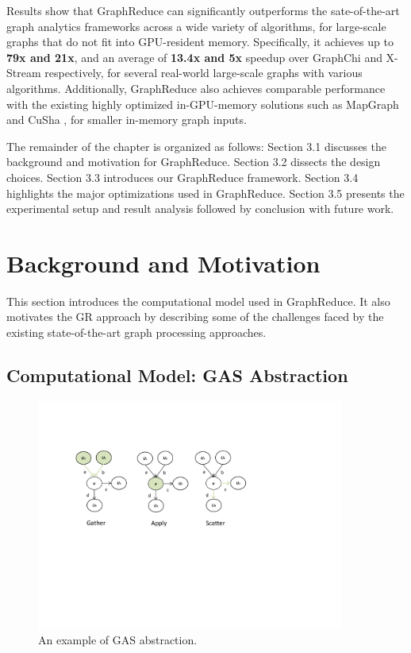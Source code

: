 Results show that GraphReduce can significantly outperforms the sate-of-the-art graph analytics frameworks across a wide variety of algorithms, for large-scale graphs that do not fit into GPU-resident memory. Specifically, it achieves up to {\bf 79x and 21x}, and an average of {\bf 13.4x and 5x} speedup over GraphChi \cite{chi} and X-Stream \cite{xstream} respectively, for several real-world large-scale graphs with various algorithms. Additionally, GraphReduce also achieves comparable performance with the existing highly optimized in-GPU-memory solutions such as MapGraph \cite{mapgraph} and CuSha \cite{cusha}, for smaller in-memory graph inputs.

The remainder of the chapter is organized as follows: Section 3.1 discusses the background and motivation for GraphReduce. Section 3.2 dissects the design choices. Section 3.3 introduces our GraphReduce framework. Section 3.4 highlights the major optimizations used in GraphReduce. Section 3.5 presents the experimental setup and result analysis followed by conclusion with future work.

\section{Background and Motivation}
\label{bg}

This section introduces the computational model used in GraphReduce. It also motivates the GR approach by describing some of
the challenges faced by the existing state-of-the-art graph processing approaches.


\subsection{Computational Model: GAS Abstraction}


\begin{figure}[!t]
\centering
\includegraphics[width=0.9\textwidth,height=\textheight,keepaspectratio]{figures/phases.pdf}
\caption{An example of GAS abstraction. }
\label{fig:phases}
\end{figure}


